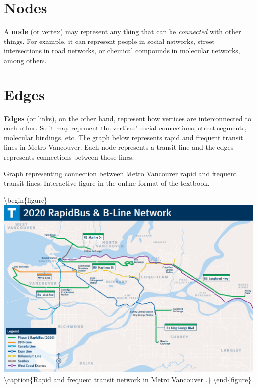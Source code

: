 \documentclass[
]{book}
\begin{document}
\hypertarget{nodes}{%
\section{Nodes}\label{nodes}}

A \textbf{node} (or vertex) may represent any thing that can be \emph{connected} with other things. For example, it can represent people in social networks, street intersections in road networks, or chemical compounds in molecular networks, among others.

\hypertarget{edges}{%
\section{Edges}\label{edges}}

\textbf{Edges} (or links), on the other hand, represent how vertices are interconnected to each other. So it may represent the vertices' social connections, street segments, molecular bindings, etc. The graph below represents rapid and frequent transit lines in Metro Vancouver. Each node represents a transit line and the edges represents connections between those lines.

\label{fig:8-vancouver-transit-graph}Graph representing connection between Metro Vancouver rapid and frequent transit lines. Interactive figure in the online format of the textbook.

\textbackslash begin\{figure\}
\includegraphics[width=15.93in]{images/08-metro_vancouver_transit_network} \textbackslash caption\{Rapid and frequent transit network in Metro Vancouver \citep{translink_2020_2020}.\}\label{fig:8-vancouver-transit-network}
\textbackslash end\{figure\}
\end{document}
